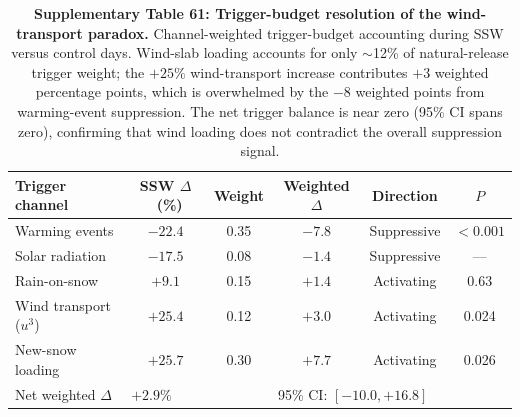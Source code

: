 \documentclass[11pt,letterpaper]{article}
\begin{document}
\begin{table}[!ht]
\centering
\caption{\textbf{Supplementary Table 61: Trigger-budget resolution of the wind-transport paradox.}
Channel-weighted trigger-budget accounting during SSW versus control days. Wind-slab loading accounts for only $\sim$12\% of natural-release trigger weight; the $+25\%$ wind-transport increase contributes $+3$ weighted percentage points, which is overwhelmed by the $-8$ weighted points from warming-event suppression. The net trigger balance is near zero (95\% CI spans zero), confirming that wind loading does not contradict the overall suppression signal.}
\label{tab:trigger_budget}
\small
\begin{tabular}{lccccc}
\toprule
Trigger channel & SSW $\Delta$~(\%) & Weight & Weighted $\Delta$ & Direction & $P$ \\
\midrule
Warming events & $-22.4$ & 0.35 & $-7.8$ & Suppressive & $< 0.001$ \\
Solar radiation & $-17.5$ & 0.08 & $-1.4$ & Suppressive & --- \\
Rain-on-snow & $+9.1$ & 0.15 & $+1.4$ & Activating & 0.63 \\
Wind transport ($u^3$) & $+25.4$ & 0.12 & $+3.0$ & Activating & 0.024 \\
New-snow loading & $+25.7$ & 0.30 & $+7.7$ & Activating & 0.026 \\
\midrule
Net weighted $\Delta$ & \multicolumn{2}{l}{$+2.9\%$} & \multicolumn{3}{l}{95\% CI: $[-10.0, +16.8]$} \\
\bottomrule
\end{tabular}
\end{table}
\end{document}
